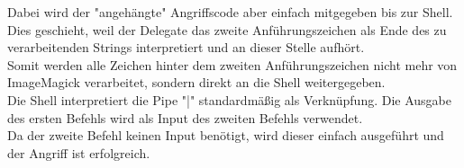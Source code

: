 Dabei wird der "angehängte" Angriffscode aber einfach mitgegeben bis zur Shell.\\
Dies geschieht, weil der Delegate das zweite Anführungszeichen als Ende des zu verarbeitenden Strings interpretiert und an dieser Stelle aufhört.\\
Somit werden alle Zeichen hinter dem zweiten Anführungszeichen nicht mehr von ImageMagick verarbeitet, sondern direkt an die Shell weitergegeben.\\
Die Shell interpretiert die Pipe "|" standardmäßig als Verknüpfung. Die Ausgabe des ersten Befehls wird als Input des zweiten Befehls verwendet.\\
Da der zweite Befehl keinen Input benötigt, wird dieser einfach ausgeführt und der Angriff ist erfolgreich.\\

